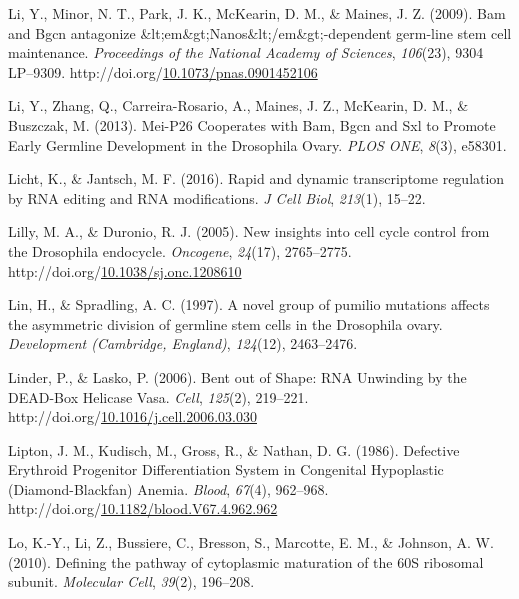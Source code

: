 \documentclass[12pt,oneside]{reedthesis}
\newlength{\cslhangindent}
\newenvironment{CSLReferences}[2] %
 {%
  \setlength{\parindent}{0pt}
  \ifodd #1 \everypar{\setlength{\hangindent}{\cslhangindent}}\ignorespaces\fi
  \ifnum #2 > 0
  \setlength{\parskip}{#2\baselineskip}
  \fi
 }%
 {}
\begin{document}
\begin{CSLReferences}{1}{0}
\leavevmode{}%
Li, Y., Minor, N. T., Park, J. K., McKearin, D. M., \& Maines, J. Z. (2009). Bam and {Bgcn} antagonize \&lt;em\&gt;{Nanos}\&lt;/em\&gt;-dependent germ-line stem cell maintenance. \emph{Proceedings of the National Academy of Sciences}, \emph{106}(23), 9304 LP--9309. http://doi.org/\href{https://doi.org/10.1073/pnas.0901452106}{10.1073/pnas.0901452106}

\leavevmode{}%
Li, Y., Zhang, Q., Carreira-Rosario, A., Maines, J. Z., McKearin, D. M., \& Buszczak, M. (2013). Mei-{P26 Cooperates} with {Bam}, {Bgcn} and {Sxl} to {Promote Early Germline Development} in the {Drosophila Ovary}. \emph{PLOS ONE}, \emph{8}(3), e58301.

\leavevmode{}%
Licht, K., \& Jantsch, M. F. (2016). Rapid and dynamic transcriptome regulation by {RNA} editing and {RNA} modifications. \emph{J Cell Biol}, \emph{213}(1), 15--22.

\leavevmode{}%
Lilly, M. A., \& Duronio, R. J. (2005). New insights into cell cycle control from the {Drosophila} endocycle. \emph{Oncogene}, \emph{24}(17), 2765--2775. http://doi.org/\href{https://doi.org/10.1038/sj.onc.1208610}{10.1038/sj.onc.1208610}

\leavevmode{}%
Lin, H., \& Spradling, A. C. (1997). A novel group of pumilio mutations affects the asymmetric division of germline stem cells in the {Drosophila} ovary. \emph{Development (Cambridge, England)}, \emph{124}(12), 2463--2476.

\leavevmode{}%
Linder, P., \& Lasko, P. (2006). Bent out of {Shape}: {RNA Unwinding} by the {DEAD}-{Box Helicase Vasa}. \emph{Cell}, \emph{125}(2), 219--221. http://doi.org/\href{https://doi.org/10.1016/j.cell.2006.03.030}{10.1016/j.cell.2006.03.030}

\leavevmode{}%
Lipton, J. M., Kudisch, M., Gross, R., \& Nathan, D. G. (1986). Defective {Erythroid Progenitor Differentiation System} in {Congenital Hypoplastic} ({Diamond}-{Blackfan}) {Anemia}. \emph{Blood}, \emph{67}(4), 962--968. http://doi.org/\href{https://doi.org/10.1182/blood.V67.4.962.962}{10.1182/blood.V67.4.962.962}

\leavevmode{}%
Lo, K.-Y., Li, Z., Bussiere, C., Bresson, S., Marcotte, E. M., \& Johnson, A. W. (2010). Defining the pathway of cytoplasmic maturation of the {60S} ribosomal subunit. \emph{Molecular Cell}, \emph{39}(2), 196--208.


\end{CSLReferences}
\end{document}
